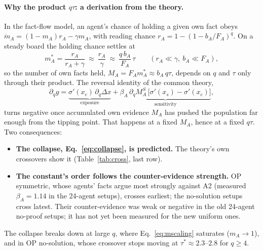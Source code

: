 \documentclass[10pt,a4paper]{article}
\begin{document}
\paragraph{Why the product $q\tau$: a derivation from the theory.} In the fact-flow model, an agent's chance of holding
a given own fact obeys $\dot m_A=(1-m_A)r_A-\gamma m_A$, with reading chance $r_A=1-(1-b_A/F_A)^q$. On a steady board
the holding chance settles at
\begin{equation}
m_A^*=\frac{r_A}{r_A+\gamma}\ \approx\ \frac{r_A}{\gamma}\ \approx\ \frac{q\,b_A}{F_A}\,\tau\qquad(r_A\ll\gamma,\ b_A\ll
F_A),\label{eq:mscaling}
\end{equation}
so the number of own facts held, $M_A=F_Am_A^*\approx b_A\,q\tau$, depends on $q$ and $\tau$ only through their
product. The reversal identity of the common theory,
\begin{equation}
\partial_q g=\underbrace{\sigma'(x_c)\,\partial_q\Delta x}_{\text{exposure}}+\underbrace{\beta_A\,\partial_qM_A^{S}\,
\big[\sigma'(x_s)-\sigma'(x_c)\big]}_{\text{sensitivity}},\label{eq:rev}
\end{equation}
turns negative once accumulated own evidence $M_A$ has pushed the population far enough from the tipping point. That
happens at a fixed $M_A$, hence at a fixed $q\tau$. Two consequences:
\begin{itemize}
\item \textbf{The collapse, Eq.~\eqref{eq:collapse}, is predicted.} The theory's own crossovers show it
  (Table~\ref{tab:cross}, last row).
\item \textbf{The constant's order follows the counter-evidence strength.} OP symmetric, whose agents' facts argue
  most strongly against A2 (measured $\beta_A=1.14$ in the 24-agent setups), crosses earliest; the no-solution setups cross latest. Their counter-evidence was weak or negative in the old 24-agent no-proof
  setups; it has not yet been measured for the new uniform ones.
\end{itemize}
The collapse breaks down at large $q$, where Eq.~\eqref{eq:mscaling} saturates ($m_A\to1$), and in OP no-solution,
whose crossover stops moving at $\tau^*\approx2.3$--$2.8$ for $q\ge4$.
\end{document}
